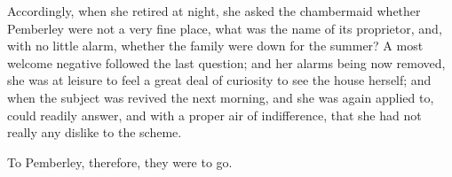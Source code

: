 Accordingly, when she retired at night, she asked the chambermaid whether Pemberley were not a very fine place, what was the name of its proprietor, and, with no little alarm, whether the family were down for the summer? A most welcome negative followed the last question; and her alarms being now removed, she was at leisure to feel a great deal of curiosity to see the house herself; and when the subject was revived the next morning, and she was again applied to, could readily answer, and with a proper air of indifference, that she had not really any dislike to the scheme.

To Pemberley, therefore, they were to go.


\begin{letter}
	\enlargethispage{\baselineskip} 
\end{letter}